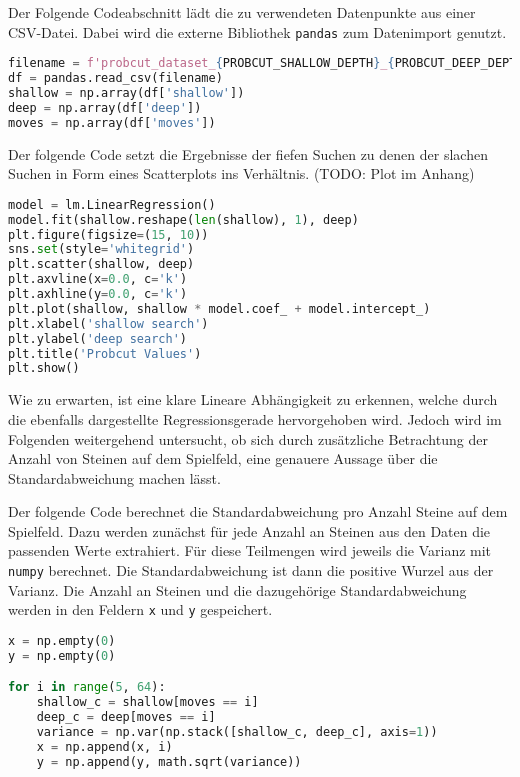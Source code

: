 Der Folgende Codeabschnitt lädt die zu verwendeten Datenpunkte aus einer
CSV-Datei. Dabei wird die externe Bibliothek
\passthrough{\lstinline!pandas!} zum Datenimport genutzt.

\begin{lstlisting}[language=Python]
filename = f'probcut_dataset_{PROBCUT_SHALLOW_DEPTH}_{PROBCUT_DEEP_DEPTH}.csv'
df = pandas.read_csv(filename)
shallow = np.array(df['shallow'])
deep = np.array(df['deep'])
moves = np.array(df['moves'])
\end{lstlisting}

Der folgende Code setzt die Ergebnisse der fiefen Suchen zu denen der
slachen Suchen in Form eines Scatterplots ins Verhältnis. (TODO: Plot im
Anhang)

\begin{lstlisting}[language=Python]
model = lm.LinearRegression()
model.fit(shallow.reshape(len(shallow), 1), deep)
plt.figure(figsize=(15, 10))
sns.set(style='whitegrid')
plt.scatter(shallow, deep)
plt.axvline(x=0.0, c='k')
plt.axhline(y=0.0, c='k')
plt.plot(shallow, shallow * model.coef_ + model.intercept_)
plt.xlabel('shallow search')
plt.ylabel('deep search')
plt.title('Probcut Values')
plt.show()
\end{lstlisting}

Wie zu erwarten, ist eine klare Lineare Abhängigkeit zu erkennen, welche
durch die ebenfalls dargestellte Regressionsgerade hervorgehoben wird.
Jedoch wird im Folgenden weitergehend untersucht, ob sich durch
zusätzliche Betrachtung der Anzahl von Steinen auf dem Spielfeld, eine
genauere Aussage über die Standardabweichung machen lässt.

Der folgende Code berechnet die Standardabweichung pro Anzahl Steine auf
dem Spielfeld. Dazu werden zunächst für jede Anzahl an Steinen aus den
Daten die passenden Werte extrahiert. Für diese Teilmengen wird jeweils
die Varianz mit \passthrough{\lstinline!numpy!} berechnet. Die
Standardabweichung ist dann die positive Wurzel aus der Varianz. Die
Anzahl an Steinen und die dazugehörige Standardabweichung werden in den
Feldern \passthrough{\lstinline!x!} und \passthrough{\lstinline!y!}
gespeichert.

\begin{lstlisting}[language=Python]
x = np.empty(0)
y = np.empty(0)

for i in range(5, 64):
    shallow_c = shallow[moves == i]
    deep_c = deep[moves == i]
    variance = np.var(np.stack([shallow_c, deep_c], axis=1))
    x = np.append(x, i)
    y = np.append(y, math.sqrt(variance))
\end{lstlisting}

